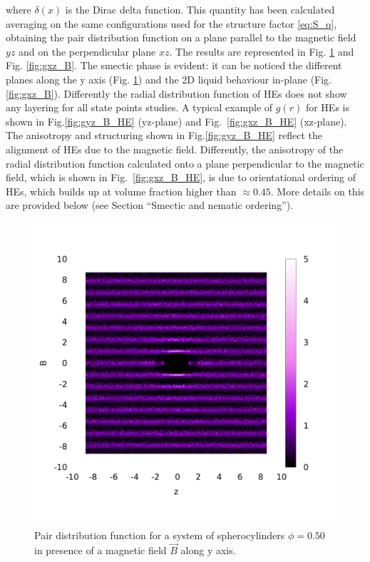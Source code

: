 \documentclass[aip,graphicx]{revtex4-1}
\begin{document}
where $\delta(x)$ is the Dirac delta function. This quantity has been calculated averaging on the same configurations used for the structure factor \ref{eq:S_q}, obtaining the pair distribution function on a plane parallel to the magnetic field $yz$ and on the perpendicular plane $xz$. The results are represented in Fig. \ref{fig:gyz_B} and Fig. \ref{fig:gxz_B}. The smectic phase is evident: it can be noticed the different planes along the y axis (Fig. \ref{fig:gyz_B}) and the 2D liquid behaviour in-plane (Fig. \ref{fig:gxz_B}).
Differently the radial distribution function of HEs does not show any layering for all state points studies.
A typical example of $g(r)$ for HEs is shown in Fig.\ref{fig:gyz_B_HE} (yz-plane) and Fig.~\ref{fig:gxz_B_HE} (xz-plane). The anisotropy and structuring shown in Fig.\ref{fig:gyz_B_HE} reflect the alignment of HEs due
to the magnetic field. Differently, the anisotropy of the radial distribution function calculated
onto a plane perpendicular to the magnetic field, which is shown in Fig.~\ref{fig:gxz_B_HE}, is due to 
orientational ordering of HEs, which builds up at volume fraction higher than $\approx 0.45$. 
More details on this are provided below (see Section ``Smectic and nematic ordering'').

\begin{figure}
    \begin{center}
    \includegraphics[width=0.7\columnwidth]{gyz_B.png}
    \caption{Pair distribution function for a system of spherocylinders $\phi = 0.50$ in presence of a magnetic field $\vec{B}$ along y axis.}
    \label{fig:gyz_B}
    \end{center}
\end{figure}
\end{document}
